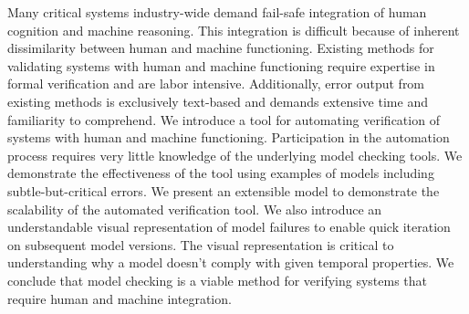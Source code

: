 \begin{comment}
Functional integration of human cognition and machine reasoning is an industry-wide problem where failure risks health or safety.
Differences in human versus machine functioning obscure conventional integration. 
We introduce cognitive work problems (CWP) for rigorous, verifiable functional integration. 
CWP specify the cognitive problem that integrated designs must solve. 
They are technology-neutral, abstract work objects, allowing people and computing to share and transform them in coordination.
The end-to-end method is illustrated on a system that employs AI for remote patient monitoring (RPM) during COVID-19 home care. 
The CWP specified \emph{actionable risk awareness} as the medical problem RPM must solve.
Graphical modeling standards enabled user participation: CWP as finite state machines and system behavior in BPMN. 
For model checking, the CWP’s logical content was translated to linear temporal logic (LTL) and the BPMN into Promela as inputs to the SPIN model checker. 
SPIN verified the Promela implements the LTL correctly.
We conclude this CWP-derived RPM design solves the medical problem and enhances patient safety. 
The method appears general to many critical systems.

\end{comment}

Many critical systems industry-wide demand fail-safe integration of human cognition and machine reasoning.
This integration is difficult because of inherent dissimilarity between human and machine functioning.
Existing methods for validating systems with human and machine functioning require expertise in formal verification and are labor intensive.
Additionally, error output from existing methods is exclusively text-based and demands extensive time and familiarity to comprehend.
We introduce a tool for automating verification of systems with human and machine functioning.
Participation in the automation process requires very little knowledge of the underlying model checking tools.
We demonstrate the effectiveness of the tool using examples of models including subtle-but-critical errors.
We present an extensible model to demonstrate the scalability of the automated verification tool.
We also introduce an understandable visual representation of model failures to enable quick iteration on subsequent model versions.
The visual representation is critical to understanding why a model doesn't comply with given temporal properties.
We conclude that model checking is a viable method for verifying systems that require human and machine integration.
